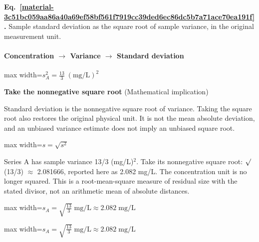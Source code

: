 \documentclass[11pt,a4paper]{article}
\begin{document}
\par\medskip
{}
\label{material-3c51bc059aa86a40a69ef58bf561f7919cc39ded6ec86dc5b7a71ace70ea191f}
\noindent\textbf{Eq.~\ref*{material-3c51bc059aa86a40a69ef58bf561f7919cc39ded6ec86dc5b7a71ace70ea191f}.} Sample standard deviation as the square root of sample variance, in the original measurement unit.\par\nopagebreak
\paragraph{Concentration \ensuremath{\to} Variance \ensuremath{\to} Standard deviation}
\begin{center}\begin{adjustbox}{max width=\linewidth}$\displaystyle s_A^2=\frac{13}{3}\;(\mathrm{mg/L})^2$\end{adjustbox}\end{center}
\noindent\textbf{Take the nonnegative square root} (Mathematical implication)\par
Standard deviation is the nonnegative square root of variance. Taking the square root also restores the original physical unit. It is not the mean absolute deviation, and an unbiased variance estimate does not imply an unbiased square root.
\begin{center}\begin{adjustbox}{max width=\linewidth}$\displaystyle s=\sqrt{s^2}$\end{adjustbox}\end{center}

Series A has sample variance 13/3 (mg/L)\ensuremath{{}^2}.
Take its nonnegative square root: \ensuremath{\sqrt{\vphantom{x}}}(13/3) \ensuremath{\approx} 2.081666, reported here as 2.082 mg/L. The concentration unit is no longer squared.
This is a root-mean-square measure of residual size with the stated divisor, not an arithmetic mean of absolute distances.
\begin{center}\begin{adjustbox}{max width=\linewidth}$\displaystyle s_A=\sqrt{\frac{13}{3}}\;\mathrm{mg/L}\approx2.082\;\mathrm{mg/L}$\end{adjustbox}\end{center}


\begin{center}\begin{adjustbox}{max width=\linewidth}$\displaystyle s_A=\sqrt{\frac{13}{3}}\;\mathrm{mg/L}\approx2.082\;\mathrm{mg/L}$\end{adjustbox}\end{center}
\end{document}
